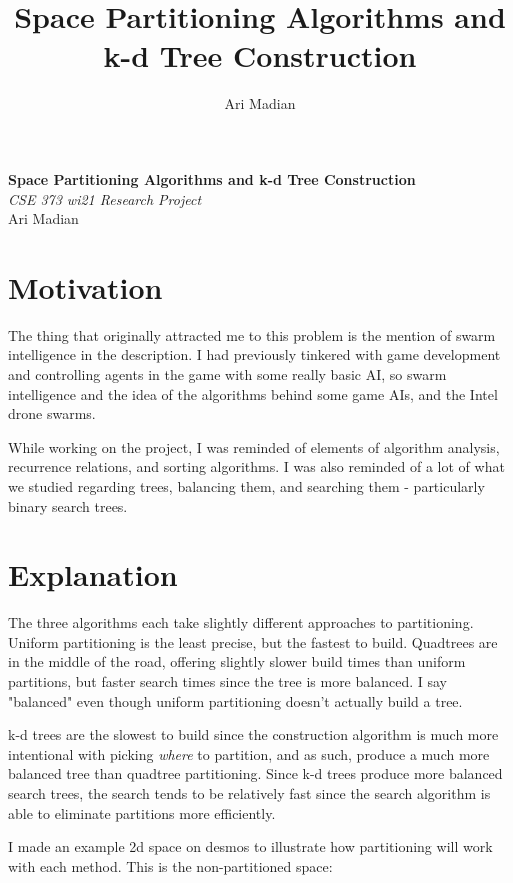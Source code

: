 \documentclass{article}
\title{Space Partitioning Algorithms and k-d Tree Construction}
\author{Ari Madian}
\begin{document}
\begin{center}
  \Large\textbf{Space Partitioning Algorithms and k-d Tree Construction}\\
  \textit{CSE 373 wi21 Research Project}\\
  Ari Madian
\end{center}

\tableofcontents
\pagebreak

\section{Motivation}
The thing that originally attracted me to this problem is the mention of swarm intelligence in the description.
I had previously tinkered with game development and controlling agents in the game with some really basic AI, so
swarm intelligence and the idea of the algorithms behind some game AIs, and the Intel drone swarms.

While working on the project, I was reminded of elements of algorithm analysis, recurrence relations, and sorting
algorithms. I was also reminded of a lot of what we studied regarding trees, balancing them, and searching them - particularly binary search trees.

\section{Explanation}
The three algorithms each take slightly different approaches to partitioning. Uniform partitioning is the least precise, but the fastest to build.
Quadtrees are in the middle of the road, offering slightly slower build times than uniform partitions, but faster search times since the tree is more balanced.
I say "balanced" even though uniform partitioning doesn't actually build a tree.

k-d trees are the slowest to build since the construction algorithm is much more intentional with picking \textit{where} to
partition, and as such, produce a much more balanced tree than quadtree partitioning. Since k-d trees produce more balanced
search trees, the search tends to be relatively fast since the search algorithm is able to eliminate partitions more efficiently.

I made an example 2d space on desmos to illustrate how partitioning will work with each method. This is the non-partitioned space:
\end{document}
